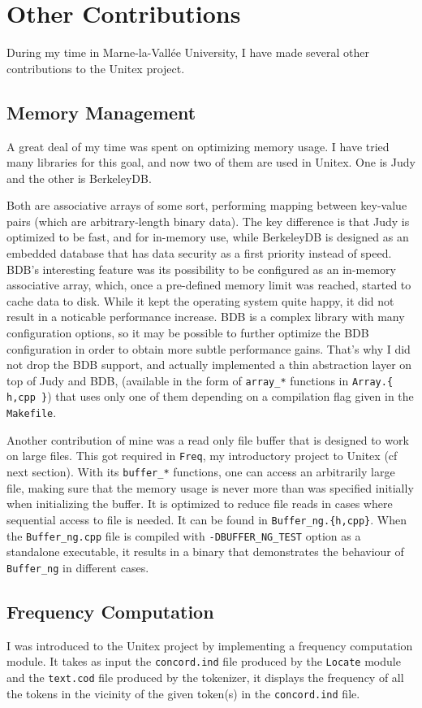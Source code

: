 \documentclass[a4paper,12pt,oneside]{article}
\begin{document}
\section{Other Contributions}
During my time in Marne-la-Vallée University, I have made several other contributions to the Unitex project.

\subsection{Memory Management}
A great deal of my time was spent on optimizing memory usage. I have tried many libraries for this goal, and now two of them are used in Unitex. One is Judy and the other is BerkeleyDB.

Both are associative arrays of some sort, performing mapping between key-value pairs (which are arbitrary-length binary data). The key difference is that Judy is optimized to be fast, and for in-memory use, while BerkeleyDB is designed as an embedded database that has data security as a first priority instead of speed. BDB's interesting feature was its possibility to be configured as an in-memory associative array, which, once a pre-defined memory limit was reached, started to cache data to disk. While it kept the operating system quite happy, it did not result in a noticable performance increase. BDB is a complex library with many configuration options, so it may be possible to further optimize the BDB configuration in order to obtain more subtle performance gains. That's why I did not drop the BDB support, and actually implemented a thin abstraction layer on top of Judy and BDB, (available in the form of \texttt{array\_*} functions in \texttt{Array.\{ h,cpp \}}) that uses only one of them depending on a compilation flag given in the \texttt{Makefile}.

Another contribution of mine was a read only file buffer that is designed to work on large files. This got required in \texttt{Freq}, my introductory project to Unitex (cf next section). With its \texttt{buffer\_*} functions, one can access an arbitrarily large file, making sure that the memory usage is never more than was specified initially when initializing the buffer. It is optimized to reduce file reads in cases where sequential access to file is needed. It can be found in \texttt{Buffer\_ng.\{h,cpp\}}. When the \texttt{Buffer\_ng.cpp} file is compiled with \texttt{-DBUFFER\_NG\_TEST} option as a standalone executable, it results in a binary that demonstrates the behaviour of \texttt{Buffer\_ng} in different cases.

\subsection{Frequency Computation}
I was introduced to the Unitex project by implementing a frequency computation module. It takes as input the \texttt{concord.ind} file produced by the \texttt{Locate} module and the \texttt{text.cod} file produced by the tokenizer, it displays the frequency of all the tokens in the vicinity of the given token(s) in the \texttt{concord.ind} file.


\end{document}
